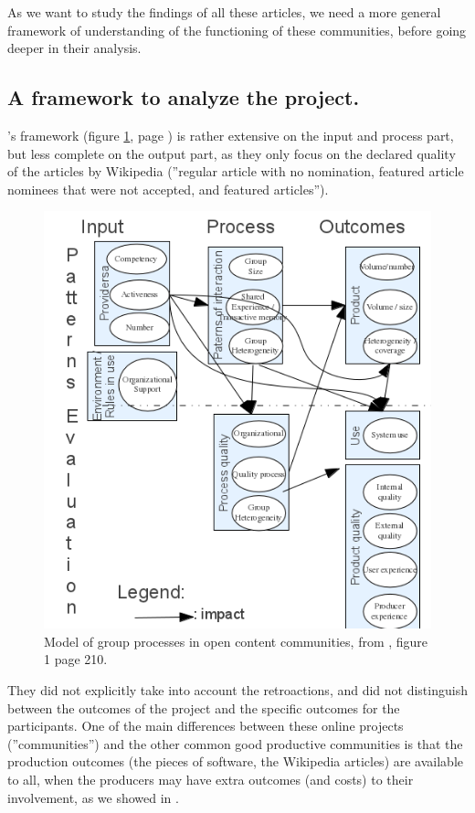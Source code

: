 As we want to study the findings of all these articles, we need a
more general framework of understanding of the functioning of these
communities, before going deeper in their analysis. 

\subsection{A framework to analyze the project.}

\citet{CarilloOkoli11}'s framework (figure \ref{fig:Model-of-group},
page \pageref{fig:Model-of-group}) is rather extensive on the input
and process part, but less complete on the output part, as they only
focus on the declared quality of the articles by Wikipedia (''regular
article with no nomination, featured article nominees that were not
accepted, and featured articles''). 

\begin{figure}
\caption{\label{fig:Model-of-group}Model of group processes in open content
communities, from \citet{CarilloOkoli11}, figure 1 page 210.}

\includegraphics{Model_group_processes_open_communities_carillo_okoli}
\end{figure}

They did not explicitly take into account the retroactions, and did
not distinguish between the outcomes of the project and the specific
outcomes for the participants. One of the main differences between
these online projects (''communities'') and the other common good
productive communities is that the production outcomes (the pieces
of software, the Wikipedia articles) are available to all, when the
producers may have extra outcomes (and costs) to their involvement,
as we showed in \citet{JullienRoudautleSquin11}. 

